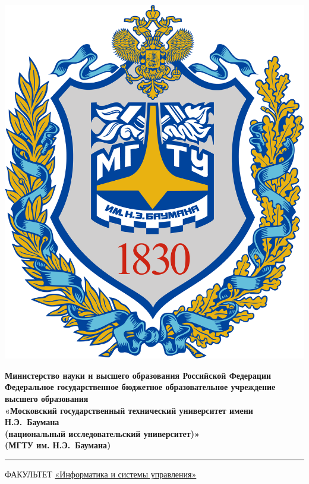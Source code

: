 \documentclass[a4paper,12pt]{article}
\author{Казакова Элиза}
\date{\today}
\begin{document}
	
\begin{titlepage}
	\fontsize{12pt}{12pt}\selectfont
	\noindent \begin{minipage}{0.15\textwidth}
		\includegraphics[width=\linewidth]{ MGTU.png}
	\end{minipage}
	\noindent\begin{minipage}{0.9\textwidth}\centering
		\textbf{Министерство науки и высшего образования Российской Федерации}\\
		\textbf{Федеральное государственное бюджетное образовательное учреждение высшего образования}\\
		\textbf{«Московский государственный технический университет имени Н.Э.~Баумана}\\
		\textbf{(национальный исследовательский университет)»}\\
		\textbf{(МГТУ им. Н.Э.~Баумана)}
	\end{minipage}
	
	\noindent\rule{18cm}{3pt}
	\newline\newline
	\noindent 
	ФАКУЛЬТЕТ 
	\underline{«Информатика и системы управления»} \newline\newline
	

\end{titlepage}
\end{document}
